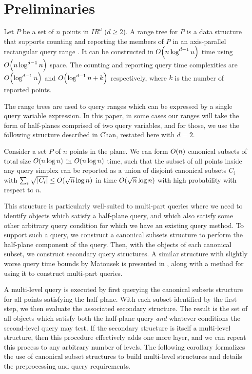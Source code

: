 \section{Preliminaries}
\label{prelim}

Let $P$ be a set of $n$ points in $I\!\!R^d$ ($d \geq 2$). A range tree for $P$ 
is a data structure that supports counting and reporting the members of $P$ in 
an axis-parallel rectangular query range
\cite[Chapter~5]{Deberg}.
It can be constructed in  $O\!\left(n \log^{d-1}{n}\right)$ time using 
$O\!\left(n \log^{d-1}{n}\right)$ space. The counting and reporting query time 
complexities are 
$O\!\left(\log^{d-1}{n}\right)$ and $O\!\left(\log^{d-1}{n} + k\right)$ respectively, where  $k$ 
is the number of reported points.

The range trees are used to query ranges which can be expressed by a single 
query variable expression.
In this paper, in some cases our ranges will take the form of half-planes 
comprised of two query variables, 
and for those, we use the following structure described in Chan\cite{chan2012}, 
restated here with $d=2$.

\begin{theorem}
\label{th:chan}
Consider a set $P$ of $n$ points in the plane. We can form $O\!\left(n\right)$ canonical subsets of total size $O\!\left(n \log{n}\right)$ in 
$O\!\left(n \log{n}\right)$ time, such that the subset of all points inside any query 
simplex can be reported as a union of disjoint canonical subsets $C_i$ with 
$\sum_i{\sqrt{|C_i|}} \leq O\!\left(\sqrt{n}\log{n}\right)$ in time 
$O\!\left(\sqrt{n}\log{n}\right)$ with high probability with respect to $n$.
\end{theorem}

This structure is particularly well-suited to multi-part queries where we need 
to identify objects which satisfy a half-plane query, 
and which also satisfy some other arbitrary query condition for which we have an 
existing query method.
To support such a query, we construct a canonical subsets structure to perform 
the half-plane component of the query. 
Then, with the objects of each canonical subset, we construct secondary query 
structures.
A similar structure with slightly worse query time bounds by 
Matousek\cite{Matousek92} is presented in \cite[Chapter~16]{Deberg}, 
along with a method for using it to construct multi-part queries.

A multi-level query is executed by first querying the canonical subsets 
structure for all points satisfying the half-plane.
With each subset identified by the first step, we then evaluate the associated 
secondary structure.
The result is the set of all objects which satisfy both the half-plane query 
\emph{and} whatever conditions the second-level query may test.
If the secondary structure is itself a multi-level structure, then this 
procedure effectively adds one more layer, and we can repeat this process to any 
arbitrary number of levels.
The following corollary formalizes the use of canonical subset structures to 
build multi-level structures and details the preprocessing and query 
requirements.


